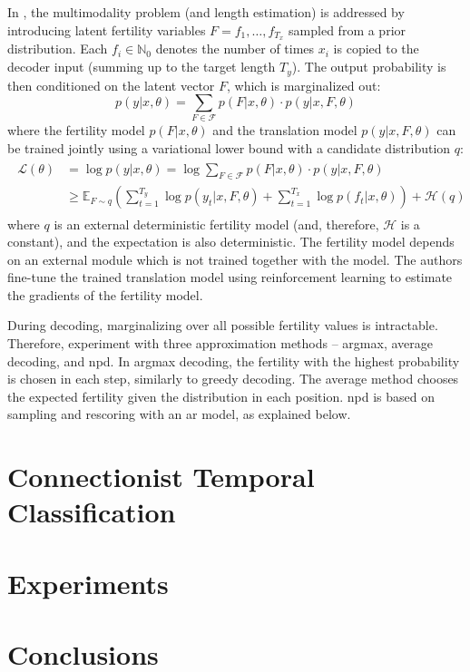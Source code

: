 In \citet{gu2017nonautoregressive}, the multimodality problem (and length
estimation) is addressed by introducing latent fertility variables
$F = f_1, \ldots, f_{T_x}$ sampled from a prior distribution. Each
$f_i \in \mathbb{N}_0$ denotes the number of times $x_i$ is copied to the
decoder input (summing up to the target length $T_y$). The output probability
is then conditioned on the latent vector $F$, which is marginalized out:
%
\begin{equation}
  p(y|x, \theta) = \sum_{F \in \mathcal{F}} p(F|x, \theta) \cdot p(y|x, F, \theta)
\end{equation}
%
where the fertility model $p(F|x, \theta)$ and the translation model
$p(y|x, F, \theta)$ can be trained jointly using a variational lower bound with
a candidate distribution $q$:
\begin{align}
  \begin{split}
    \mathcal{L}(\theta)
    & = \log p(y|x, \theta) = \log \sum_{F \in \mathcal{F}} p(F| x, \theta ) \cdot p(y | x, F, \theta) \\
    & \geq \mathbb{E}_{F \sim q} \left(\sum_{t=1}^{T_y} \log p(y_t | x, F,
      \theta) + \sum_{t=1}^{T_x} \log p(f_t | x, \theta) \right) +
    \mathcal{H}(q)
  \end{split}
\end{align}
%
where $q$ is an external deterministic fertility model (and, therefore,
$\mathcal{H}$ is a constant), and the expectation is also deterministic.  The
fertility model depends on an external module which is not trained together
with the model. The authors fine-tune the trained translation model using
reinforcement learning \citep{williams1992simple} to estimate the gradients of
the fertility model.

During decoding, marginalizing over all possible fertility values is
intractable. Therefore, \citet{gu2017nonautoregressive} experiment with three
approximation methods -- argmax, average decoding, and \ac{npd}. In argmax
decoding, the fertility with the highest probability is chosen in each step,
similarly to greedy decoding. The average method chooses the expected fertility
given the distribution in each position. \ac{npd} is based on sampling and
rescoring with an \acl{ar} model, as explained below.


\chapter{Connectionist Temporal Classification}

\chapter{Experiments}

\chapter{Conclusions}


